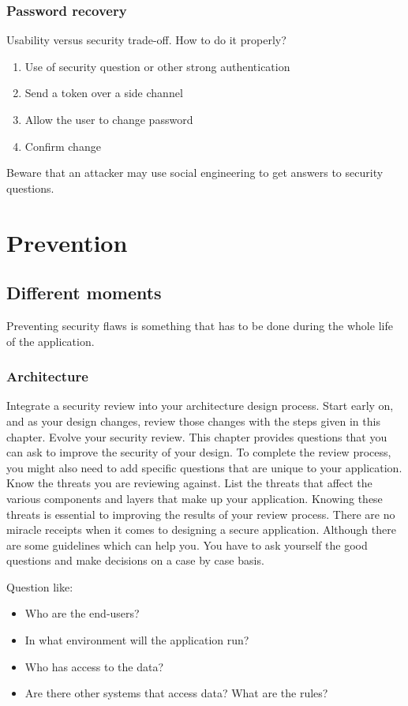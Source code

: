 \subsubsection{Password recovery}
Usability versus security trade-off.
How to do it properly?
\begin{enumerate}
\item Use of security question or other strong authentication
\item Send a token over a side channel
\item Allow the user to change password
\item Confirm change
\end{enumerate}
Beware that an attacker may use social engineering to get answers to security
questions.

\section{Prevention}

\subsection{Different moments}
Preventing security flaws is something that has to be done during the
whole life of the application.

\subsubsection{Architecture}
Integrate a security review into your architecture design process. Start
early on, and as your design changes, review those changes with the
steps given in this chapter.
Evolve your security review. This chapter provides questions that you
can ask to improve the security of your design. To complete the review
process, you might also need to add specific questions that are unique
to your application.
Know the threats you are reviewing against. List the threats that affect the
various components and layers that make up your application.
Knowing these threats is essential to improving the results of your review process.
There are no miracle receipts when it comes to designing a secure
application. Although there are some guidelines which can help you. You
have to ask yourself the good questions and make decisions on a case by
case basis.

Question like:
\begin{itemize}
\item Who are the end-users?
\item In what environment will the application run?
\item Who has access to the data?
\item Are there other systems that access data? What are the rules?
\end{itemize}

